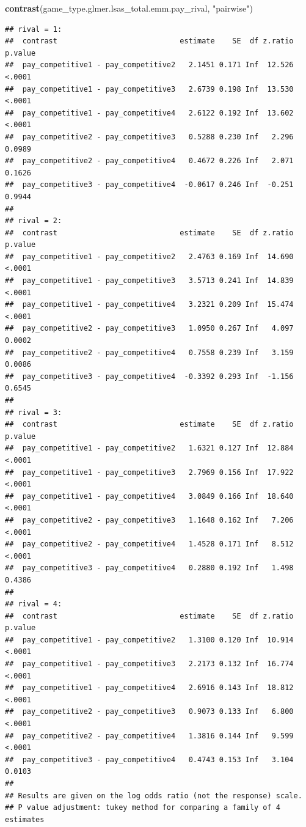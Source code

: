 \documentclass[
]{article}
\newenvironment{Shaded}{\begin{snugshade}}{\end{snugshade}}
\newcommand{\FunctionTok}[1]{\textcolor[rgb]{0.13,0.29,0.53}{\textbf{#1}}}
\newcommand{\NormalTok}[1]{#1}
\newcommand{\StringTok}[1]{\textcolor[rgb]{0.31,0.60,0.02}{#1}}
\begin{document}
\begin{Shaded}
\begin{Highlighting}[]
\FunctionTok{contrast}\NormalTok{(game\_type.glmer.lsas\_total.emm.pay\_rival, }\StringTok{"pairwise"}\NormalTok{)}
\end{Highlighting}
\end{Shaded}

\begin{verbatim}
## rival = 1:
##  contrast                            estimate    SE  df z.ratio p.value
##  pay_competitive1 - pay_competitive2   2.1451 0.171 Inf  12.526  <.0001
##  pay_competitive1 - pay_competitive3   2.6739 0.198 Inf  13.530  <.0001
##  pay_competitive1 - pay_competitive4   2.6122 0.192 Inf  13.602  <.0001
##  pay_competitive2 - pay_competitive3   0.5288 0.230 Inf   2.296  0.0989
##  pay_competitive2 - pay_competitive4   0.4672 0.226 Inf   2.071  0.1626
##  pay_competitive3 - pay_competitive4  -0.0617 0.246 Inf  -0.251  0.9944
## 
## rival = 2:
##  contrast                            estimate    SE  df z.ratio p.value
##  pay_competitive1 - pay_competitive2   2.4763 0.169 Inf  14.690  <.0001
##  pay_competitive1 - pay_competitive3   3.5713 0.241 Inf  14.839  <.0001
##  pay_competitive1 - pay_competitive4   3.2321 0.209 Inf  15.474  <.0001
##  pay_competitive2 - pay_competitive3   1.0950 0.267 Inf   4.097  0.0002
##  pay_competitive2 - pay_competitive4   0.7558 0.239 Inf   3.159  0.0086
##  pay_competitive3 - pay_competitive4  -0.3392 0.293 Inf  -1.156  0.6545
## 
## rival = 3:
##  contrast                            estimate    SE  df z.ratio p.value
##  pay_competitive1 - pay_competitive2   1.6321 0.127 Inf  12.884  <.0001
##  pay_competitive1 - pay_competitive3   2.7969 0.156 Inf  17.922  <.0001
##  pay_competitive1 - pay_competitive4   3.0849 0.166 Inf  18.640  <.0001
##  pay_competitive2 - pay_competitive3   1.1648 0.162 Inf   7.206  <.0001
##  pay_competitive2 - pay_competitive4   1.4528 0.171 Inf   8.512  <.0001
##  pay_competitive3 - pay_competitive4   0.2880 0.192 Inf   1.498  0.4386
## 
## rival = 4:
##  contrast                            estimate    SE  df z.ratio p.value
##  pay_competitive1 - pay_competitive2   1.3100 0.120 Inf  10.914  <.0001
##  pay_competitive1 - pay_competitive3   2.2173 0.132 Inf  16.774  <.0001
##  pay_competitive1 - pay_competitive4   2.6916 0.143 Inf  18.812  <.0001
##  pay_competitive2 - pay_competitive3   0.9073 0.133 Inf   6.800  <.0001
##  pay_competitive2 - pay_competitive4   1.3816 0.144 Inf   9.599  <.0001
##  pay_competitive3 - pay_competitive4   0.4743 0.153 Inf   3.104  0.0103
## 
## Results are given on the log odds ratio (not the response) scale. 
## P value adjustment: tukey method for comparing a family of 4 estimates
\end{verbatim}
\end{document}
